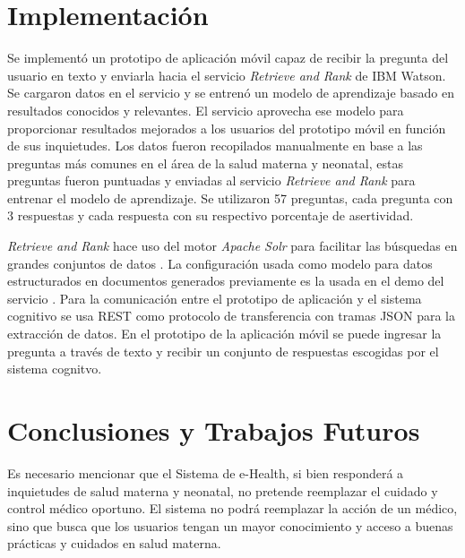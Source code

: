 \documentclass[12pt]{article}
\begin{document}

\section{Implementación}

Se implementó un prototipo de aplicación móvil capaz de recibir la pregunta del usuario en texto y enviarla hacia el servicio \emph{Retrieve and Rank} de IBM Watson. Se cargaron datos en el servicio y se entrenó un modelo de aprendizaje basado en resultados conocidos y relevantes. El servicio aprovecha ese modelo para proporcionar resultados mejorados \cite{ibm2016} a los usuarios del prototipo móvil en función de sus inquietudes. Los datos fueron recopilados manualmente en base a las preguntas más comunes en el área de la salud materna y neonatal, estas preguntas fueron puntuadas y enviadas al servicio \emph{Retrieve and Rank} para entrenar el modelo de aprendizaje. Se utilizaron 57 preguntas, cada pregunta con 3 respuestas y cada respuesta con su respectivo porcentaje de asertividad.

\emph{Retrieve and Rank} hace uso del motor \emph{Apache Solr} para facilitar las búsquedas en grandes conjuntos de datos \cite{ibm2016}. La configuración usada como modelo para datos estructurados en documentos generados previamente es la usada en el demo del servicio \cite{ibm2015rr}. Para la comunicación entre el prototipo de aplicación y el sistema cognitivo se usa REST como protocolo de transferencia con tramas JSON para la extracción de datos. En el prototipo de la aplicación móvil se puede ingresar la pregunta a través de texto y recibir un conjunto de respuestas escogidas por el sistema cognitvo.


\section{Conclusiones y Trabajos Futuros}

Es necesario mencionar que el Sistema de e-Health, si bien responderá a inquietudes de salud materna y neonatal, no pretende reemplazar el cuidado y control médico oportuno. El sistema no podrá reemplazar la acción de un médico, sino que busca que los usuarios tengan un mayor conocimiento y acceso a buenas prácticas y cuidados en salud materna.
\end{document}

